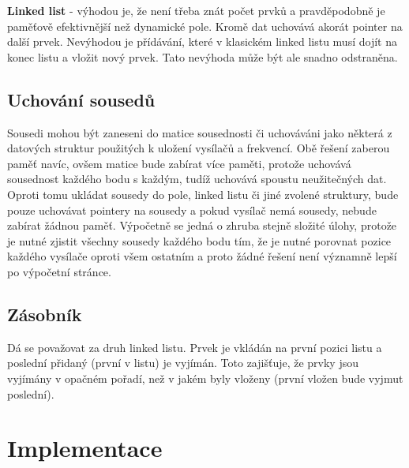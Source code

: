 \documentclass[12pt]{article}
\begin{document}
\textbf{Linked list} - výhodou je, že není třeba znát počet prvků a 
pravděpodobně je paměťově efektivnější než dynamické pole. Kromě dat
uchovává akorát pointer na další prvek. Nevýhodou je přídávání, které v 
klasickém linked listu musí dojít na konec listu a vložit nový prvek. Tato 
nevýhoda může být ale snadno odstraněna.
%
\subsection{Uchování sousedů}
%
Sousedi mohou být zaneseni do matice sousednosti či uchováváni jako některá z 
datových struktur použitých k uložení vysílačů a frekvencí. Obě řešení 
zaberou paměť navíc, ovšem matice bude zabírat více paměti, protože uchovává 
sousednost každého bodu s každým, tudíž uchovává spoustu neužitečných dat. 
Oproti tomu ukládat sousedy do pole, linked listu či jiné zvolené struktury,
bude pouze uchovávat pointery na sousedy a pokud vysílač nemá sousedy, nebude 
zabírat žádnou paměť. Výpočetně se jedná o zhruba stejně složité úlohy, protože
je nutné zjistit všechny sousedy každého bodu tím, že je nutné porovnat pozice
každého vysílače oproti všem ostatním a proto žádné řešení není významně lepší
po výpočetní stránce.
%
\subsection{Zásobník}
%
Dá se považovat za druh linked listu. Prvek je vkládán na první pozici listu a 
poslední přidaný (první v listu) je vyjímán. Toto zajišťuje, že prvky jsou 
vyjímány v opačném pořadí, než v jakém byly vloženy (první vložen bude vyjmut 
poslední).
%
%
\section{Implementace}
%
\end{document}
